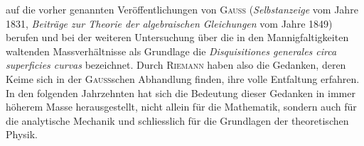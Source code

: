 \clearpage{}\setcounter{footnote}{0}
\noindent auf die vorher genannten Veröffentlichungen von \textsc{Gauss} (\textit{Selbstanzeige} vom
Jahre 1831, \textit{Beiträge zur Theorie der algebraischen Gleichungen} vom Jahre
1849) berufen und bei der weiteren Untersuchung über die in den Mannigfaltigkeiten
waltenden Massverhältnisse als Grundlage die \textit{Disquisitiones generales
circa superficies curvas} bezeichnet. Durch \textsc{Riemann} haben also die Gedanken,
deren Keime sich in der \textsc{Gauss}schen Abhandlung finden, ihre volle
Entfaltung erfahren. In den folgenden Jahrzehnten hat sich die Bedeutung
dieser Gedanken in immer höherem Masse herausgestellt, nicht allein für die
Mathematik, sondern auch für die analytische Mechanik und schliesslich für
die Grundlagen der theoretischen Physik.
\clearpage\endgroup
